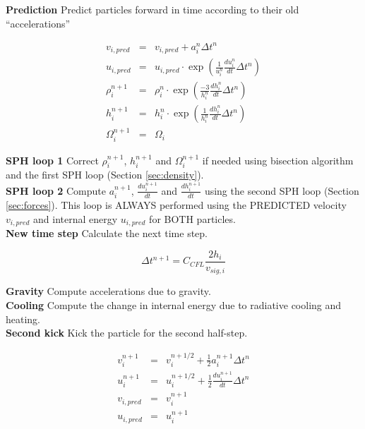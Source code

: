 \documentclass[a4paper,10pt]{article}
\begin{document}
\textbf{Prediction} Predict particles forward in time according to their old ``accelerations''

\begin{eqnarray*}
 v_{i,pred} &=& v_{i,pred} + a_i^{n} \Delta t^n \\
  u_{i,pred} &=& u_{i,pred} \cdot \exp\left(\frac{1}{u_i^n}\frac{du_i^{n}}{dt} \Delta t^n\right)\\
 \rho_i^{n+1} &=& \rho_i^n \cdot \exp\left(\frac{-3}{h_i^n}  \frac{dh_i^{n}}{dt} \Delta t^n \right) \\
  h_i^{n+1} &=& h_i^n \cdot \exp\left(\frac{1}{h_i^n}  \frac{dh_i^{n}}{dt} \Delta t^n \right)   \\
  \Omega_i^{n+1} &=& \Omega_i
\end{eqnarray*}

\textbf{SPH loop 1} Correct $\rho_i^{n+1}$, $h_i^{n+1}$ and $\Omega_i^{n+1}$ if needed using bisection algorithm and the
first SPH loop (Section \ref{sec:density}). \\

\textbf{SPH loop 2} Compute $a_i^{n+1}$, $\frac{du_i^{n+1}}{dt}$ and $\frac{dh_i^{n+1}}{dt}$ using the second SPH
loop (Section \ref{sec:forces}). This loop is ALWAYS performed using the PREDICTED velocity $v_{i,pred}$ and internal
energy $u_{i,pred}$ for BOTH particles. \\

\textbf{New time step} Calculate the next time step.

\begin{equation*}
 \Delta t^{n+1} = C_{CFL} \frac{2h_i}{v_{sig,i}}
\end{equation*}


\textbf{Gravity} Compute accelerations due to gravity. \\

\textbf{Cooling} Compute the change in internal energy due to radiative cooling and heating. \\

\textbf{Second kick} Kick the particle for the second half-step.

\begin{eqnarray*}
 v_i^{n+1} &=& v_i^{n+1/2} + \frac{1}{2} a_i^{n+1}\Delta t^{n} \\
 u_i^{n+1} &=& u_i^{n+1/2} + \frac{1}{2} \frac{du_i^{n+1}}{dt}\Delta t^{n} \\
 v_{i,pred} &=& v_i^{n+1} \\
 u_{i,pred} &=& u_i^{n+1} \\
\end{eqnarray*}
\end{document}

